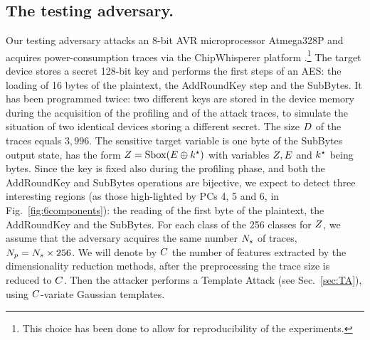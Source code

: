 \subsection{The testing adversary.}  
Our testing adversary attacks an 8-bit AVR microprocessor Atmega328P and acquires power-consumption traces via the ChipWhisperer platform \cite{o2014chipwhisperer}.\footnote{This choice has been done to allow for reproducibility of the experiments.} The target device stores a secret 128-bit key and performs the first steps of an AES: the loading of 16 bytes of the plaintext, the AddRoundKey step and the SubBytes. It has been programmed twice: two different keys are stored in the device memory during the acquisition of the profiling and of the attack traces, to simulate the situation of two identical devices storing a different secret. The size $D$ of the traces equals $3,996$. The sensitive target  variable is one byte of the SubBytes output state, \ie has the form $Z = \mathrm{Sbox}(E \oplus k^\star)$ with variables $Z, E$ and $k^\star$ being bytes. Since the key is fixed also during the profiling phase, and both the AddRoundKey and SubBytes operations are bijective, we expect to detect three interesting regions (as those high-lighted by PCs 4, 5 and 6, in Fig.~\ref{fig:6components}): the reading of the first byte of the plaintext, the AddRoundKey and the SubBytes. For each class of the 256 classes for $Z$, we assume that the adversary acquires the same number $N_{s}$ of traces, \ie $N_p =N_{s}\times 256$. We will denote by $C$ the number of features extracted by the dimensionality reduction methods, \ie after the preprocessing the trace size is reduced to $C$. Then the attacker performs a Template Attack (see Sec.~\ref{sec:TA}), using $C$-variate Gaussian templates.


